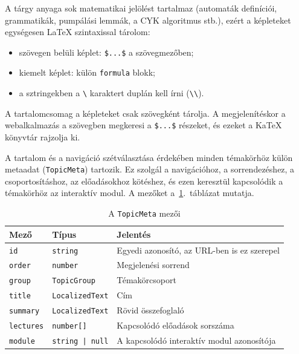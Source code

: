 A tárgy anyaga sok matematikai jelölést tartalmaz (automaták
definíciói, grammatikák, pumpálási lemmák, a CYK algoritmus stb.),
ezért a képleteket egységesen \LaTeX{} szintaxissal tárolom:

\begin{itemize}
    \item szövegen belüli képlet: \verb|$...$| a szövegmezőben;
    \item kiemelt képlet: külön \texttt{formula} blokk;
    \item a sztringekben a \verb|\| karaktert duplán kell írni
          (\verb|\\|).
\end{itemize}

A tartalomcsomag a képleteket csak szövegként tárolja. A megjelenítéskor
a webalkalmazás a szövegben megkeresi a \verb|$...$| részeket, és ezeket
a KaTeX könyvtár rajzolja ki.

A tartalom és a navigáció szétválasztása érdekében minden témakörhöz
külön metaadat (\texttt{TopicMeta}) tartozik. Ez szolgál a
navigációhoz, a sorrendezéshez, a csoportosításhoz, az előadásokhoz
kötéshez, és ezen keresztül kapcsolódik a témakörhöz az
interaktív modul. A mezőket a~\ref{tab:topicmeta}.~táblázat mutatja.

\begin{table}[htbp]
    \centering
    \begin{tabularx}{\textwidth}{l l X}
        \toprule
        \textbf{Mező} & \textbf{Típus} & \textbf{Jelentés} \\
        \midrule
        \texttt{id}       & \texttt{string}        & Egyedi azonosító, az URL-ben is ez szerepel \\
        \texttt{order}    & \texttt{number}        & Megjelenési sorrend \\
        \texttt{group}    & \texttt{TopicGroup}    & Témakörcsoport \\
        \texttt{title}    & \texttt{LocalizedText} & Cím \\
        \texttt{summary}  & \texttt{LocalizedText} & Rövid összefoglaló \\
        \texttt{lectures} & \texttt{number[]}      & Kapcsolódó előadások sorszáma \\
        \texttt{module}   & \texttt{string | null} & A kapcsolódó interaktív modul azonosítója \\
        \bottomrule
    \end{tabularx}
    \caption{A \texttt{TopicMeta} mezői}
    \label{tab:topicmeta}
\end{table}

